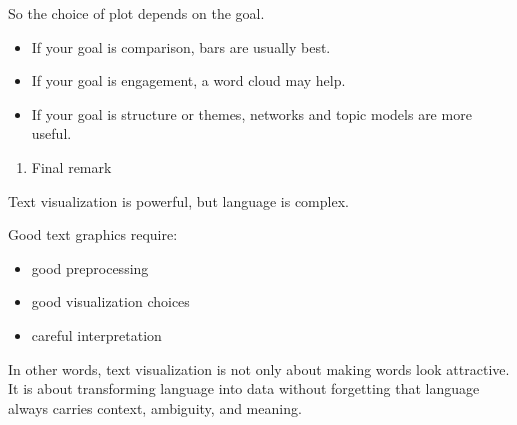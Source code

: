 \documentclass[
]{article}
\providecommand{\tightlist}{%
  \setlength{\itemsep}{0pt}\setlength{\parskip}{0pt}}
\begin{document}
So the choice of plot depends on the goal.

\begin{itemize}
\item
  If your goal is comparison, bars are usually best.
\item
  If your goal is engagement, a word cloud may help.
\item
  If your goal is structure or themes, networks and topic models are
  more useful.
\end{itemize}

\begin{enumerate}
\def\labelenumi{\arabic{enumi}.}
\setcounter{enumi}{15}
\tightlist
\item
  Final remark
\end{enumerate}

Text visualization is powerful, but language is complex.

Good text graphics require:

\begin{itemize}
\tightlist
\item
  good preprocessing
\item
  good visualization choices
\item
  careful interpretation
\end{itemize}

In other words, text visualization is not only about making words look
attractive. It is about transforming language into data without
forgetting that language always carries context, ambiguity, and meaning.
\end{document}
